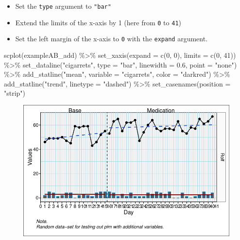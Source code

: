 \documentclass[
  letterpaper,
  DIV=11,
  numbers=noendperiod]{scrreprt}
\newenvironment{Shaded}{\begin{snugshade}}{\end{snugshade}}
\newcommand{\AttributeTok}[1]{\textcolor[rgb]{0.40,0.45,0.13}{#1}}
\newcommand{\DecValTok}[1]{\textcolor[rgb]{0.68,0.00,0.00}{#1}}
\newcommand{\FloatTok}[1]{\textcolor[rgb]{0.68,0.00,0.00}{#1}}
\newcommand{\FunctionTok}[1]{\textcolor[rgb]{0.28,0.35,0.67}{#1}}
\newcommand{\NormalTok}[1]{\textcolor[rgb]{0.00,0.23,0.31}{#1}}
\newcommand{\SpecialCharTok}[1]{\textcolor[rgb]{0.37,0.37,0.37}{#1}}
\newcommand{\StringTok}[1]{\textcolor[rgb]{0.13,0.47,0.30}{#1}}
\providecommand{\tightlist}{%
  \setlength{\itemsep}{0pt}\setlength{\parskip}{0pt}}\usepackage{longtable,booktabs,array}
\begin{document}
\begin{itemize}
\tightlist
\item
  Set the \texttt{type} argument to \texttt{"bar"}\\
\item
  Extend the limits of the x-axis by 1 (here from \texttt{0} to
  \texttt{41})\\
\item
  Set the left margin of the x-axis to \texttt{0} with the
  \texttt{expand} argument.
\end{itemize}

\begin{Shaded}
\begin{Highlighting}[]
\FunctionTok{scplot}\NormalTok{(exampleAB\_add) }\SpecialCharTok{\%\textgreater{}\%}
  \FunctionTok{set\_xaxis}\NormalTok{(}\AttributeTok{expand =} \FunctionTok{c}\NormalTok{(}\DecValTok{0}\NormalTok{, }\DecValTok{0}\NormalTok{), }\AttributeTok{limits =} \FunctionTok{c}\NormalTok{(}\DecValTok{0}\NormalTok{, }\DecValTok{41}\NormalTok{)) }\SpecialCharTok{\%\textgreater{}\%}
  \FunctionTok{set\_dataline}\NormalTok{(}\StringTok{"cigarrets"}\NormalTok{, }\AttributeTok{type =} \StringTok{"bar"}\NormalTok{, }\AttributeTok{linewidth =} \FloatTok{0.6}\NormalTok{, }\AttributeTok{point =} \StringTok{"none"}\NormalTok{) }\SpecialCharTok{\%\textgreater{}\%}
  \FunctionTok{add\_statline}\NormalTok{(}\StringTok{"mean"}\NormalTok{, }\AttributeTok{variable =} \StringTok{"cigarrets"}\NormalTok{, }\AttributeTok{color =} \StringTok{"darkred"}\NormalTok{) }\SpecialCharTok{\%\textgreater{}\%}
  \FunctionTok{add\_statline}\NormalTok{(}\StringTok{"trend"}\NormalTok{, }\AttributeTok{linetype =} \StringTok{"dashed"}\NormalTok{) }\SpecialCharTok{\%\textgreater{}\%}
  \FunctionTok{set\_casenames}\NormalTok{(}\AttributeTok{position =} \StringTok{"strip"}\NormalTok{)}
\end{Highlighting}
\end{Shaded}

\begin{figure}[H]

{\centering \includegraphics{./ch_scplot_files/figure-pdf/complex4-1.pdf}

}

\end{figure}
\end{document}
